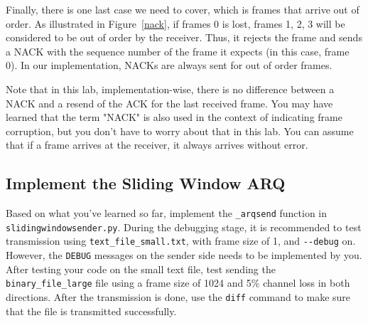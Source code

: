 \documentclass[11pt]{article}
\begin{document}
Finally, there is one last case we need to cover, which is frames that arrive out of order.
As illustrated in Figure~\ref{nack}, if frames 0 is lost, frames 1, 2, 3 will be considered to be out of order by the receiver.
Thus, it rejects the frame and sends a NACK with the sequence number of the frame it expects (in this case, frame 0).
In our implementation, NACKs are always sent for out of order frames.

Note that in this lab, implementation-wise, there is no difference between a NACK and a resend of the ACK for the last received frame.
You may have learned that the term "NACK" is also used in the context of indicating frame corruption, but you don't have to worry about that in this lab.
You can assume that if a frame arrives at the receiver, it always arrives without error.


\subsection{Implement the Sliding Window ARQ}
\label{subsec:implement-slidingwindow}
Based on what you've learned so far, implement the \texttt{\_arqsend} function in \texttt{slidingwindowsender.py}.
During the debugging stage, it is recommended to test transmission using \texttt{text\_file\_small.txt}, with frame size of 1, and \texttt{-{}-debug} on.
However, the \texttt{DEBUG} messages on the sender side needs to be implemented by you.
After testing your code on the small text file, test sending the \texttt{binary\_file\_large} file using a frame size of 1024 and 5\% channel loss in both directions.
After the transmission is done, use the \texttt{diff} command to make sure that the file is transmitted successfully.
\end{document}
